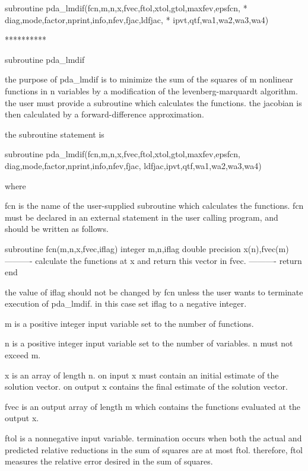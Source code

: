 \documentclass[11pt,twoside,nolof]{starlink}
\begin{document}
\begin{terminalv}
      subroutine pda_lmdif(fcn,m,n,x,fvec,ftol,xtol,gtol,maxfev,epsfcn,
     *                 diag,mode,factor,nprint,info,nfev,fjac,ldfjac,
     *                 ipvt,qtf,wa1,wa2,wa3,wa4)


     **********

     subroutine pda_lmdif

     the purpose of pda_lmdif is to minimize the sum of the squares of
     m nonlinear functions in n variables by a modification of
     the levenberg-marquardt algorithm. the user must provide a
     subroutine which calculates the functions. the jacobian is
     then calculated by a forward-difference approximation.

     the subroutine statement is

       subroutine pda_lmdif(fcn,m,n,x,fvec,ftol,xtol,gtol,maxfev,epsfcn,
                        diag,mode,factor,nprint,info,nfev,fjac,
                        ldfjac,ipvt,qtf,wa1,wa2,wa3,wa4)

     where

       fcn is the name of the user-supplied subroutine which
         calculates the functions. fcn must be declared
         in an external statement in the user calling
         program, and should be written as follows.

         subroutine fcn(m,n,x,fvec,iflag)
         integer m,n,iflag
         double precision x(n),fvec(m)
         ----------
         calculate the functions at x and
         return this vector in fvec.
         ----------
         return
         end

         the value of iflag should not be changed by fcn unless
         the user wants to terminate execution of pda_lmdif.
         in this case set iflag to a negative integer.

       m is a positive integer input variable set to the number
         of functions.

       n is a positive integer input variable set to the number
         of variables. n must not exceed m.

       x is an array of length n. on input x must contain
         an initial estimate of the solution vector. on output x
         contains the final estimate of the solution vector.

       fvec is an output array of length m which contains
         the functions evaluated at the output x.

       ftol is a nonnegative input variable. termination
         occurs when both the actual and predicted relative
         reductions in the sum of squares are at most ftol.
         therefore, ftol measures the relative error desired
         in the sum of squares.


\end{terminalv}
\end{document}
